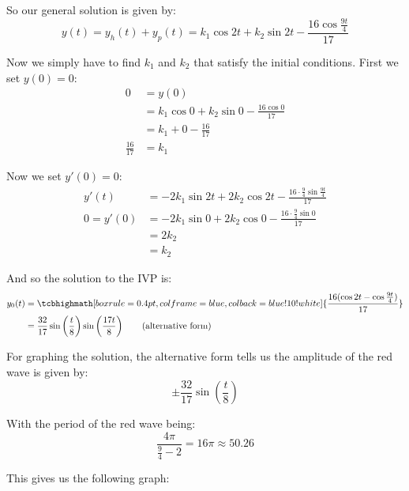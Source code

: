 \documentclass{article}
\begin{document}
So our general solution is given by:
\begin{equation*}
  y(t)=y_h(t)+y_p(t)=k_1\cos 2t+k_2\sin 2t-\frac{16\cos\frac{9t}{4}}{17}
\end{equation*}

Now we simply have to find $k_1$ and $k_2$ that satisfy the initial conditions. First we set $y(0)=0$:
\begin{align*}
  0&=y(0)\\
  &=k_1\cos 0+k_2\sin 0-\frac{16\cos0}{17}\\
  &=k_1+0-\frac{16}{17}\\
  \frac{16}{17}&=k_1
\end{align*}

Now we set $y'(0)=0$:
\begin{align*}
  y'(t)&=-2k_1\sin 2t+2k_2\cos 2t-\frac{16\cdot\frac{9}{4}\sin\frac{9t}{4}}{17}\\
  0=y'(0)&=-2k_1\sin 0+2k_2\cos 0-\frac{16\cdot\frac{9}{4}\sin0}{17}\\
  &=2k_2\\
 &=k_2
\end{align*}

And so the solution to the IVP is:
\begin{align*}
  y_0(t)&=\tcbhighmath[boxrule=0.4pt,colframe=blue,colback=blue!10!white]{\frac{16(\cos 2t-\cos\frac{9t}{4})}{17}}\\
  &=\frac{32}{17}\sin\left(\frac{t}{8}\right)\sin\left(\frac{17t}{8}\right)\tag{alternative form}
\end{align*}

For graphing the solution, the alternative form tells us the amplitude of the red wave is given by:
\begin{equation*}
  \pm\frac{32}{17}\sin\left(\frac{t}{8}\right)
\end{equation*}

With the period of the red wave being:
\begin{equation*}
  \frac{4\pi}{\frac{9}{4}-2}=16\pi\approx50.26
\end{equation*}

This gives us the following graph:
\begin{center}
\end{center}
\end{document}
